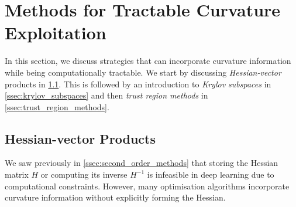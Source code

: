 \section{Methods for Tractable Curvature Exploitation}

\label{sec:tractable_curvature_exploitation}



In this section, we discuss strategies that can incorporate curvature information while being computationally tractable. We start by discussing \textit{Hessian-vector} products in \cref{ssec:hessian_vector_products}. This is followed by an introduction to \textit{Krylov subspaces} in \cref{ssec:krylov_subspaces} and then \textit{trust region methods} in \cref{ssec:trust_region_methods}.



\subsection{Hessian-vector Products}

\label{ssec:hessian_vector_products}



We saw previously in \cref{ssec:second_order_methods} that storing the Hessian matrix $H$ or computing its inverse $H^{-1}$ is infeasible in deep learning due to computational constraints. However, many optimisation algorithms incorporate curvature information without explicitly forming the Hessian. 


















